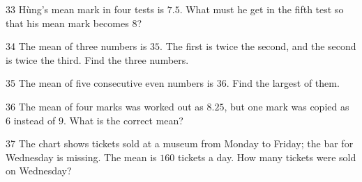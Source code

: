 \gap
\begin{probbox}{33}{}
Hùng's mean mark in four tests is $7.5$. What must he get in the fifth test so that his mean mark becomes $8$?
\end{probbox}
\gap
\begin{probbox}{34}{}
The mean of three numbers is $35$. The first is twice the second, and the second is twice the third. Find the three numbers.
\end{probbox}
\gap
\begin{probbox}{35}{}
The mean of five consecutive even numbers is $36$. Find the largest of them.
\end{probbox}
\gap
\begin{probbox}{36}{}
The mean of four marks was worked out as $8.25$, but one mark was copied as $6$ instead of $9$. What is the correct mean?
\end{probbox}
\gap
\needspace{8.5cm}
\begin{probbox}{37}{}
The chart shows tickets sold at a museum from Monday to Friday; the bar for Wednesday is missing. The mean is $160$ tickets a day. How many tickets were sold on Wednesday?
\begin{center}
\end{center}
\end{probbox}
